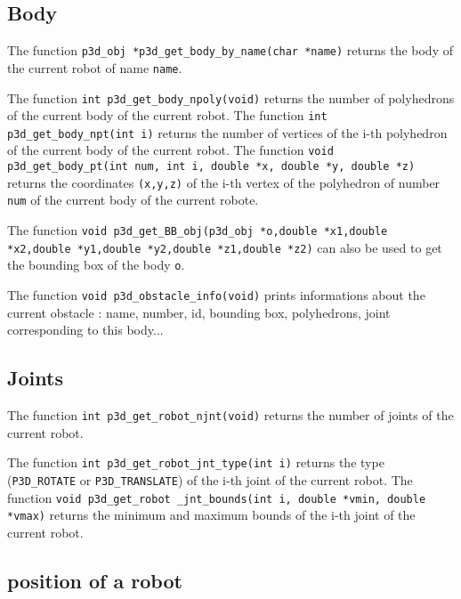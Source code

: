 \subsection{Body}

The function {\tt p3d\_obj *p3d\_get\_body\_by\_name(char *name)}
returns the body of the current robot of name {\tt name}.

The function {\tt int p3d\_get\_body\_npoly(void)}
 returns the
number of polyhedrons of the current body of the current robot. The function {\tt int
p3d\_get\_body\_npt(int i)}  returns the number of vertices of the
i-th polyhedron of the current body of the current robot. The function {\tt void
p3d\_get\_body\_pt(int num, int i, double *x, double *y, double *z)} 
returns the coordinates {\tt (x,y,z)} of the i-th vertex of the
polyhedron of number {\tt num} of the current body of the current robote. 

The function {\tt void p3d\_get\_BB\_obj(p3d\_obj *o,double *x1,double
*x2,double *y1,double *y2,double *z1,double *z2)}
 can also be used to
get the bounding box of the body {\tt o}.

The function {\tt void p3d\_obstacle\_info(void)}
 prints informations
about the current obstacle : name, number, id, bounding box,
polyhedrons, joint corresponding to this body...

\subsection{Joints}

The function {\tt int p3d\_get\_robot\_njnt(void)}
 returns the number
of joints of the current robot.

The function {\tt int p3d\_get\_robot\_jnt\_type(int i)}
 returns the type ({\tt P3D\_ROTATE}
or {\tt P3D\_TRANSLATE}) of the i-th joint of the current robot. The
function {\tt void p3d\_get\_robot \_jnt\_bounds(int i, double *vmin,
double *vmax)}  returns the
minimum and maximum bounds of the i-th joint of the current robot.

\subsection{position of a robot}


